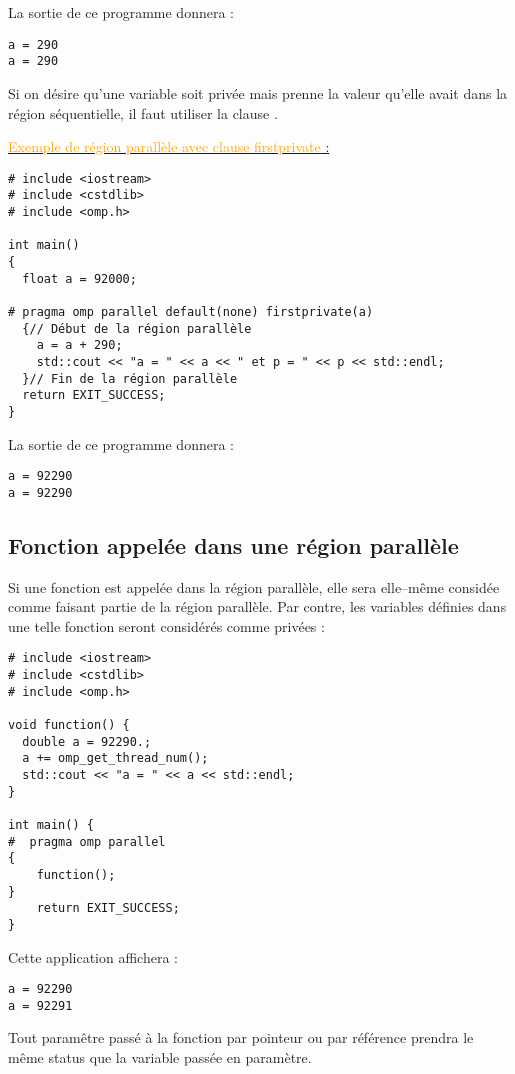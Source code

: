 \documentclass[fleqn,11pt]{article}
\begin{document}
La sortie de ce programme donnera :
\begin{verbatim}
a = 290
a = 290
\end{verbatim}

Si on désire qu'une variable soit privée mais prenne la valeur qu'elle avait dans la région séquentielle, il faut utiliser la clause
\lstinline@firstprivate@.

\underline{\textcolor{orange}{Exemple de région parallèle avec clause firstprivate} :}
\begin{lstlisting}
# include <iostream>
# include <cstdlib>
# include <omp.h>

int main()
{
  float a = 92000;
  
# pragma omp parallel default(none) firstprivate(a)
  {// Début de la région parallèle
    a = a + 290;
    std::cout << "a = " << a << " et p = " << p << std::endl;
  }// Fin de la région parallèle
  return EXIT_SUCCESS;
}
\end{lstlisting}

La sortie de ce programme donnera :
\begin{verbatim}
a = 92290
a = 92290
\end{verbatim}

\subsection{Fonction appelée dans une région parallèle}

Si une fonction est appelée dans la région parallèle, elle sera elle--même considée comme faisant partie de la
région parallèle. Par contre, les variables définies dans une telle fonction seront considérés comme privées :

\begin{lstlisting}
# include <iostream>
# include <cstdlib>
# include <omp.h>

void function() {
  double a = 92290.;
  a += omp_get_thread_num();
  std::cout << "a = " << a << std::endl;
}

int main() {
#  pragma omp parallel
{
    function();
}
    return EXIT_SUCCESS;
}
\end{lstlisting}

Cette application affichera :
\begin{verbatim}
a = 92290
a = 92291
\end{verbatim}

Tout paramêtre passé à la fonction par pointeur ou par référence prendra le même status que la variable passée en paramètre.
\end{document}
